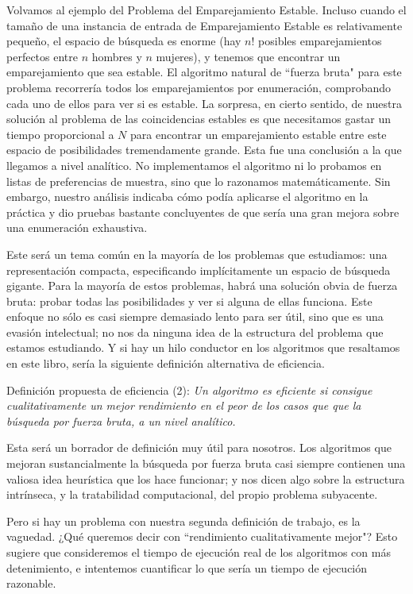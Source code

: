 \documentclass[a4paper, 12pt]{book}
\theoremstyle{dotless}
\begin{document}
Volvamos al ejemplo del Problema del Emparejamiento Estable. Incluso cuando el tamaño de una instancia de entrada de Emparejamiento Estable es relativamente pequeño, el espacio de búsqueda es enorme (hay $n!$ posibles emparejamientos perfectos entre $n$ hombres y $n$ mujeres), y tenemos que encontrar un emparejamiento que sea estable. El algoritmo natural de ``fuerza bruta" para este problema recorrería todos los emparejamientos por enumeración, comprobando cada uno de ellos para ver si es estable. La sorpresa, en cierto sentido, de nuestra solución al problema de las coincidencias estables es que necesitamos gastar un tiempo proporcional a $N$ para encontrar un emparejamiento estable
entre este espacio de posibilidades tremendamente grande. Esta fue una conclusión a la que llegamos a nivel analítico. No implementamos el algoritmo ni lo probamos en listas de preferencias de muestra, sino que lo razonamos matemáticamente. Sin embargo, nuestro análisis indicaba cómo podía aplicarse el algoritmo en la práctica y dio pruebas bastante concluyentes de que sería una gran mejora sobre una enumeración exhaustiva.

Este será un tema común en la mayoría de los problemas que estudiamos: una representación compacta, especificando implícitamente un espacio de búsqueda gigante. Para la mayoría de estos problemas, habrá una solución obvia de fuerza bruta: probar todas las posibilidades y ver si alguna de ellas funciona. Este enfoque no sólo es casi siempre demasiado lento para ser útil, sino que es una evasión intelectual; no nos da ninguna idea de la estructura del problema que estamos estudiando. 
Y si hay un hilo conductor en los algoritmos que resaltamos en este libro, sería la siguiente definición alternativa de eficiencia.

\vspace{18pt}
Definición propuesta de eficiencia (2): \textit{Un algoritmo es eficiente si consigue cualitativamente un mejor rendimiento en el peor de los casos que que la búsqueda por fuerza bruta, a un nivel analítico.}
\vspace{18pt}

Esta será un borrador de definición muy útil para nosotros. Los algoritmos que mejoran sustancialmente la búsqueda por fuerza bruta casi siempre contienen una valiosa idea heurística que los hace funcionar; y nos dicen algo sobre la estructura intrínseca, y la tratabilidad computacional, del propio problema subyacente. 

Pero si hay un problema con nuestra segunda definición de trabajo, es la vaguedad.
¿Qué queremos decir con ``rendimiento cualitativamente mejor"? Esto sugiere que consideremos el tiempo de ejecución real de los algoritmos con más detenimiento, e intentemos cuantificar lo que sería un tiempo de ejecución razonable.
\end{document}
